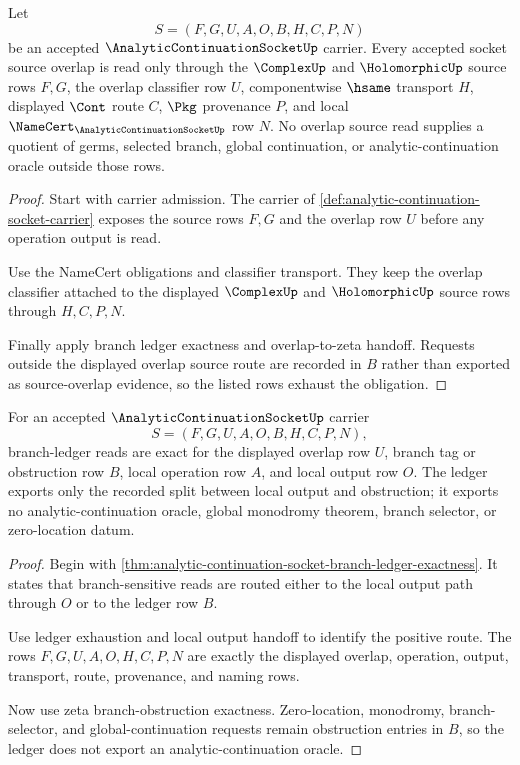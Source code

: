 \begin{theorem}
\label{thm:analytic-continuation-socket-overlap-source-obligation}
Let
$$
S=(F,G,U,A,O,B,H,C,P,N)
$$
be an accepted $\AnalyticContinuationSocketUp$ carrier. Every accepted socket source overlap is read only through the $\ComplexUp$ and $\HolomorphicUp$ source rows $F,G$, the overlap classifier row $U$, componentwise $\hsame$ transport $H$, displayed $\Cont$ route $C$, $\Pkg$ provenance $P$, and local $\NameCert_{\AnalyticContinuationSocketUp}$ row $N$. No overlap source read supplies a quotient of germs, selected branch, global continuation, or analytic-continuation oracle outside those rows.
\end{theorem}
\begin{proof}
Start with carrier admission. The carrier of \autoref{def:analytic-continuation-socket-carrier} exposes the source rows $F,G$ and the overlap row $U$ before any operation output is read.

Use the NameCert obligations and classifier transport. They keep the overlap classifier attached to the displayed $\ComplexUp$ and $\HolomorphicUp$ source rows through $H,C,P,N$.

Finally apply branch ledger exactness and overlap-to-zeta handoff. Requests outside the displayed overlap source route are recorded in $B$ rather than exported as source-overlap evidence, so the listed rows exhaust the obligation.
\end{proof}

\begin{theorem}
\label{thm:analytic-continuation-socket-branch-ledger-obligation}
For an accepted $\AnalyticContinuationSocketUp$ carrier
$$
S=(F,G,U,A,O,B,H,C,P,N),
$$
branch-ledger reads are exact for the displayed overlap row $U$, branch tag or obstruction row $B$, local operation row $A$, and local output row $O$. The ledger exports only the recorded split between local output and obstruction; it exports no analytic-continuation oracle, global monodromy theorem, branch selector, or zero-location datum.
\end{theorem}
\begin{proof}
Begin with \autoref{thm:analytic-continuation-socket-branch-ledger-exactness}. It states that branch-sensitive reads are routed either to the local output path through $O$ or to the ledger row $B$.

Use ledger exhaustion and local output handoff to identify the positive route. The rows $F,G,U,A,O,H,C,P,N$ are exactly the displayed overlap, operation, output, transport, route, provenance, and naming rows.

Now use zeta branch-obstruction exactness. Zero-location, monodromy, branch-selector, and global-continuation requests remain obstruction entries in $B$, so the ledger does not export an analytic-continuation oracle.
\end{proof}

